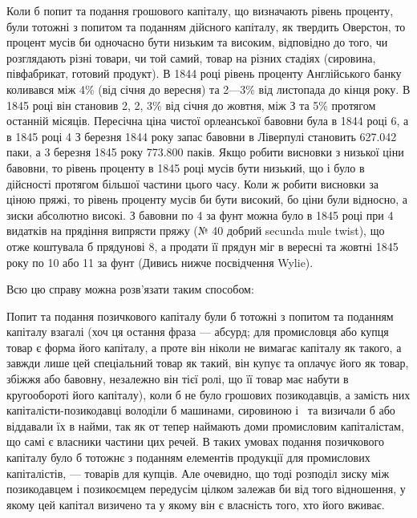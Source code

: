 Коли б попит та подання грошового капіталу, що визначають рівень
проценту, були тотожні з попитом та поданням дійсного капіталу, як твердить
Оверстон, то процент мусів би одночасно бути низьким та високим, відповідно до
того, чи розглядають різні товари, чи той самий, товар на різних стадіях (сировина,
півфабрикат, готовий продукт). В 1844 році рівень проценту Англійського банку
коливався між 4\% (від січня до вересня) та 2—3\% від листопада до
кінця року. В 1845 році він становив 2, 2, 3\% від січня до жовтня, між
З та 5\% протягом останній місяців. Пересічна ціна чистої орлеанської бавовни
була в 1844 році 6, а в 1845 році 4 З березня 1844 року
запас бавовни в Ліверпулі становить \num{627.042} паки, а 3 березня 1845 року
\num{773.800} паків. Якщо робити висновки з низької ціни бавовни, то рівень проценту
в 1845 році мусів бути низький, що і було в дійсності протягом більшої
частини цього часу. Коли ж робити висновки за ціною пряжі, то рівень проценту
мусів би бути високий, бо ціни були відносно, а зиски абсолютно високі.
З бавовни по 4 за фунт можна було в 1845 році при 4 видатків
на прядіння випрясти пряжу (№ 40 добрий secunda mule twist), що отже коштувала
б прядунові 8, а продати її прядун міг в вересні та жовтні 1845 року
по 10 або 11 за фунт (Дивись нижче посвідчення Wylie).

Всю цю справу можна розв’язати таким способом:

Попит та подання позичкового капіталу були б тотожні з попитом та поданням
капіталу взагалі (хоч ця остання фраза — абсурд; для промисловця або
купця товар є форма його капіталу, а проте він ніколи не вимагає капіталу як
такого, а завжди лише цей спеціальний товар як такий, він купує та оплачує
його як товар, збіжжя або бавовну, незалежно він тієї ролі, що її товар має
набути в кругообороті його капіталу), коли б не було грошових позикодавців,
а замість них капіталісти-позикодавці володіли б машинами, сировиною і~ та
визичали б або віддавали їх в найми, так як от тепер наймають доми промисловим
капіталістам, що самі є власники частини цих речей. В таких умовах
подання позичкового капіталу було б тотожнє з поданням елементів продукції
для промислових капіталістів, — товарів для купців. Але очевидно, що тоді розподіл
зиску між позикодавцем і позикоємцем передусім цілком залежав би від
того відношення, у якому цей капітал визичено та у якому він є власність
того, хто його вживає.

